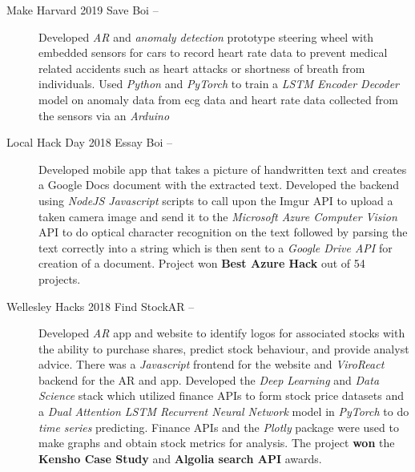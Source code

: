 \documentclass[letterpaper, 8pt]{extarticle}
\begin{document}
\begin{description}
\item[Make Harvard 2019 Save Boi --] Developed \emph{AR} and \emph{anomaly detection} prototype steering wheel with embedded sensors for cars to record heart rate data to prevent medical related accidents such as heart attacks or shortness of breath from individuals. Used \emph{Python} and \emph{PyTorch} to train a \emph{LSTM Encoder Decoder} model on anomaly data from ecg data and heart rate data collected from the sensors via an \emph{Arduino}
\item[Local Hack Day 2018 Essay Boi --] Developed mobile app that takes a picture of handwritten text and creates a Google Docs document with the extracted text. Developed the backend using \emph{NodeJS Javascript} scripts to call upon the Imgur API to upload a taken camera image and send it to the \emph{Microsoft Azure Computer Vision} API to do optical character recognition on the text followed by parsing the text correctly into a string which is then sent to a \emph{Google Drive API} for creation of a document. Project won \textbf{Best Azure Hack} out of 54 projects.

\begin{comment}
\item[Boston Hacks 2018 Vetricle --] Developed social network meet up app and website for Veterans to use to connect to other veterans and do projects and activities together. \emph{Javascript}, \emph{ReactJS/Native}, and \emph{Google Firebase} are used to create the app and website. \emph{Collaborative Filtering} through \emph{Cosine distance} and a \emph{Neural autoencoder} is used to create a friend recommender system made in \emph{Python} and \emph{PyTorch}. 
\end{comment}

\item[Wellesley Hacks 2018 Find StockAR --]Developed \emph{AR} app and website to identify logos for associated stocks with the ability to purchase shares, predict stock behaviour, and provide analyst advice. There was a \emph{Javascript} frontend for the website and \emph{ViroReact} backend for the AR and app. Developed the \emph{Deep Learning} and \emph{Data Science} stack which utilized finance APIs to form stock price datasets and a \emph{Dual Attention LSTM Recurrent Neural Network} model in \emph{PyTorch} to do \emph{time series} predicting. Finance APIs and the \emph{Plotly} package were used to make graphs and obtain stock metrics for analysis. The project \textbf{won} the \textbf{Kensho Case Study} and \textbf{Algolia search API} awards.


\end{description}
\end{document}
